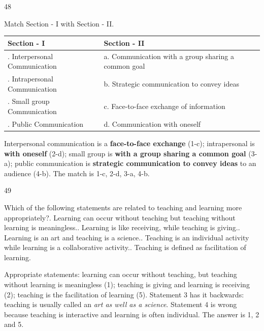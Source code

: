 \begin{question}{48}
{Match Section - I with Section - II.\par\smallskip\begin{tabularx}{\linewidth}{@{}>{\raggedright\arraybackslash}X>{\raggedright\arraybackslash}X@{}}\toprule
\textbf{Section - I} & \textbf{Section - II}\\\midrule
1. Interpersonal Communication & a. Communication with a group sharing a common goal\\
2. Intrapersonal Communication & b. Strategic communication to convey ideas\\
3. Small group Communication & c. Face-to-face exchange of information\\
4. Public Communication & d. Communication with oneself\\
\bottomrule\end{tabularx}\par\smallskip
\par}
\begin{explain}
Interpersonal communication is a \textbf{face-to-face exchange} (1-c); intrapersonal is \textbf{with oneself} (2-d); small group is \textbf{with a group sharing a common goal} (3-a); public communication is \textbf{strategic communication to convey ideas} to an audience (4-b). The match is 1-c, 2-d, 3-a, 4-b.
\end{explain}
\end{question}

\begin{question}{49}
{Which of the following statements are related to teaching and learning more appropriately?. Learning can occur without teaching but teaching without learning is meaningless.. Learning is like receiving, while teaching is giving.. Learning is an art and teaching is a science.. Teaching is an individual activity while learning is a collaborative activity.. Teaching is defined as facilitation of learning.\par}
\begin{explain}
Appropriate statements: learning can occur without teaching, but teaching without learning is meaningless (1); teaching is giving and learning is receiving (2); teaching is the facilitation of learning (5).
Statement 3 has it backwards: teaching is usually called an \emph{art as well as a science}. Statement 4 is wrong because teaching is interactive and learning is often individual. The answer is 1, 2 and 5.
\end{explain}
\end{question}

